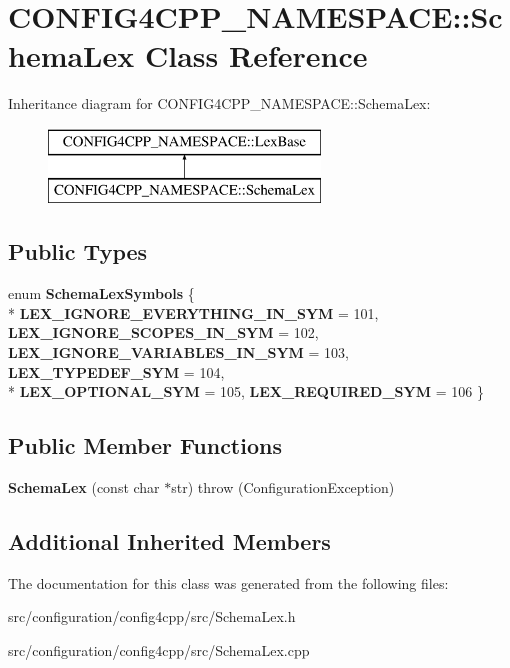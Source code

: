 \hypertarget{classCONFIG4CPP__NAMESPACE_1_1SchemaLex}{\section{C\-O\-N\-F\-I\-G4\-C\-P\-P\-\_\-\-N\-A\-M\-E\-S\-P\-A\-C\-E\-:\-:Schema\-Lex Class Reference}
\label{classCONFIG4CPP__NAMESPACE_1_1SchemaLex}
}
Inheritance diagram for C\-O\-N\-F\-I\-G4\-C\-P\-P\-\_\-\-N\-A\-M\-E\-S\-P\-A\-C\-E\-:\-:Schema\-Lex\-:\begin{figure}[H]
\begin{center}
\leavevmode
\includegraphics[height=2.000000cm]{classCONFIG4CPP__NAMESPACE_1_1SchemaLex}
\end{center}
\end{figure}
\subsection*{Public Types}
\begin{DoxyCompactItemize}
\item 
enum {\bfseries Schema\-Lex\-Symbols} \{ \\*
{\bfseries L\-E\-X\-\_\-\-I\-G\-N\-O\-R\-E\-\_\-\-E\-V\-E\-R\-Y\-T\-H\-I\-N\-G\-\_\-\-I\-N\-\_\-\-S\-Y\-M} = 101, 
{\bfseries L\-E\-X\-\_\-\-I\-G\-N\-O\-R\-E\-\_\-\-S\-C\-O\-P\-E\-S\-\_\-\-I\-N\-\_\-\-S\-Y\-M} = 102, 
{\bfseries L\-E\-X\-\_\-\-I\-G\-N\-O\-R\-E\-\_\-\-V\-A\-R\-I\-A\-B\-L\-E\-S\-\_\-\-I\-N\-\_\-\-S\-Y\-M} = 103, 
{\bfseries L\-E\-X\-\_\-\-T\-Y\-P\-E\-D\-E\-F\-\_\-\-S\-Y\-M} = 104, 
\\*
{\bfseries L\-E\-X\-\_\-\-O\-P\-T\-I\-O\-N\-A\-L\-\_\-\-S\-Y\-M} = 105, 
{\bfseries L\-E\-X\-\_\-\-R\-E\-Q\-U\-I\-R\-E\-D\-\_\-\-S\-Y\-M} = 106
 \}
\end{DoxyCompactItemize}
\subsection*{Public Member Functions}
\begin{DoxyCompactItemize}
\item 
\hypertarget{classCONFIG4CPP__NAMESPACE_1_1SchemaLex_a1f2d21646bc92a783f2fd29e6f2652e8}{{\bfseries Schema\-Lex} (const char $\ast$str)  throw (\-Configuration\-Exception)}\label{classCONFIG4CPP__NAMESPACE_1_1SchemaLex_a1f2d21646bc92a783f2fd29e6f2652e8}

\end{DoxyCompactItemize}
\subsection*{Additional Inherited Members}


The documentation for this class was generated from the following files\-:\begin{DoxyCompactItemize}
\item 
src/configuration/config4cpp/src/Schema\-Lex.\-h\item 
src/configuration/config4cpp/src/Schema\-Lex.\-cpp\end{DoxyCompactItemize}
